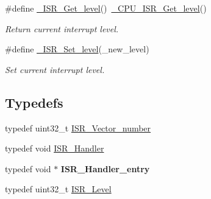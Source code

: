 \begin{DoxyCompactItemize}
\#define \mbox{\hyperlink{group__RTEMSScoreISR_gab54704104a6c83ee1e649af116d0419e}{\+\_\+\+I\+S\+R\+\_\+\+Get\+\_\+level}}()~\mbox{\hyperlink{group__RTEMSScoreCPUARM_ga1d9dcab9170d532b6634a5620385adbd}{\+\_\+\+C\+P\+U\+\_\+\+I\+S\+R\+\_\+\+Get\+\_\+level}}()
\begin{DoxyCompactList}\small\item\em Return current interrupt level. \end{DoxyCompactList}\item 
\#define \mbox{\hyperlink{group__RTEMSScoreISR_gad3209e74ff910d9870c298b8adf3fb32}{\+\_\+\+I\+S\+R\+\_\+\+Set\+\_\+level}}(\+\_\+new\+\_\+level)
\begin{DoxyCompactList}\small\item\em Set current interrupt level. \end{DoxyCompactList}\end{DoxyCompactItemize}
\subsection*{Typedefs}
\begin{DoxyCompactItemize}
\item 
typedef uint32\+\_\+t \mbox{\hyperlink{group__RTEMSScoreISR_gad594e7073b09d33d6b5d1dd2f313fb18}{I\+S\+R\+\_\+\+Vector\+\_\+number}}
\item 
typedef void \mbox{\hyperlink{group__RTEMSScoreISR_ga49c3b0ab3e84ccac78941b867bf34ccf}{I\+S\+R\+\_\+\+Handler}}
\item 
\mbox{\label{group__RTEMSScoreISR_ga1776f7f71ed2844dc1f3ef0e7fae046a}} 
typedef void $\ast$ {\bfseries I\+S\+R\+\_\+\+Handler\+\_\+entry}
\item 
typedef uint32\+\_\+t \mbox{\hyperlink{group__RTEMSScoreISR_gad1af728587ebcefec5b5cf94fc7909b9}{I\+S\+R\+\_\+\+Level}}
\end{DoxyCompactItemize}

